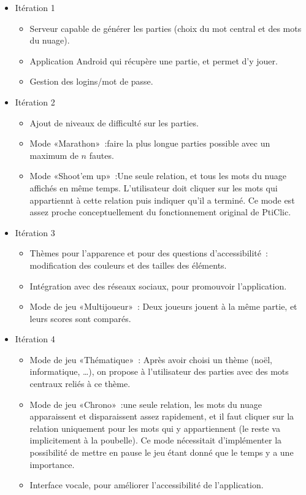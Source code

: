 \documentclass[a4paper,11pt,french]{article}
\def\android{Android\texttrademark{}}
\begin{document}
{\begin{itemize}
\item Itération 1
  \begin{itemize}
  \item Serveur capable de générer les parties (choix du mot central et des mots du nuage).
  \item Application \android{} qui récupère une partie, et permet d'y jouer.
  \item Gestion des logins/mot de passe.
  \end{itemize}
\item Itération 2
  \begin{itemize}
  \item Ajout de niveaux de difficulté sur les parties.
  \item Mode «Marathon»~:faire la plus longue parties possible avec un maximum de $n$ fautes.
  \item Mode «Shoot'em up»~:Une seule relation, et tous les mots du nuage affichés en même temps. L'utilisateur doit cliquer sur les mots
    qui appartiennt à cette relation puis indiquer qu'il a terminé. Ce mode est assez proche conceptuellement du fonctionnement original de
    PtiClic.
  \end{itemize}
\item Itération 3
  \begin{itemize}
  \item Thèmes pour l'apparence et pour des questions d'accessibilité~: modification des couleurs et des tailles des éléments.
  \item Intégration avec des réseaux sociaux, pour promouvoir l'application.
  \item Mode de jeu «Multijoueur»~: Deux joueurs jouent à la même partie, et leurs scores sont comparés.
  \end{itemize}
\item Itération 4
  \begin{itemize}
  \item Mode de jeu «Thématique»~: Après avoir choisi un thème (noël, informatique, \dots), on propose à l'utilisateur des parties avec des
    mots centraux reliés à ce thème.
  \item Mode de jeu «Chrono»~:une seule relation, les mots du nuage apparaissent et disparaissent assez rapidement, et il faut cliquer sur
    la relation uniquement pour les mots qui y appartiennent (le reste va implicitement à la poubelle). Ce mode nécessitait d'implémenter la
    possibilité de mettre en pause le jeu étant donné que le temps y a une importance.
  \item Interface vocale, pour améliorer l'accessibilité de l'application.
  \end{itemize}
\end{itemize}

}
\end{document}
